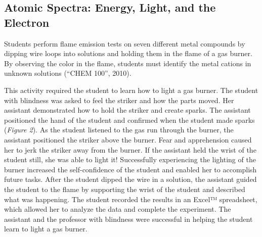 \documentclass[11.5pt]{sig-alternate} %
\begin{document}
\begin{large}
\subsection*{Atomic Spectra: Energy, Light, and the Electron}

Students perform flame emission tests on seven different metal compounds by dipping wire loops into solutions and holding them in the flame of a gas burner. By observing the color in the flame, students must identify the metal cations in unknown solutions (“CHEM 100”, 2010). 

This activity required the student to learn how to light a gas burner. The student with blindness was asked to feel the striker and how the parts moved. Her assistant demonstrated how to hold the striker and create sparks. The assistant positioned the hand of the student and confirmed when the student made sparks (\textit{Figure 2}). As the student listened to the gas run through the burner, the assistant positioned the striker above the burner. Fear and apprehension caused her to jerk the striker away from the burner. If the assistant held the wrist of the student still, she was able to light it! Successfully experiencing the lighting of the burner increased the self-confidence of the student and enabled her to accomplish future tasks. After the student dipped the wire in a solution, the assistant guided the student to the flame by supporting the wrist of the student and described what was happening. The student recorded the results in an Excel™ spreadsheet, which allowed her to analyze the data and complete the experiment. The assistant and the professor with blindness were successful in helping the student learn to light a gas burner. 


\end{large}
\end{document}
